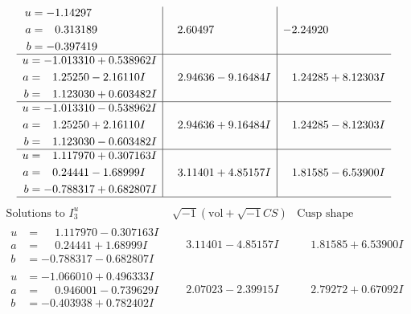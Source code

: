 \documentclass[1p]{elsarticle_modified}
\theoremstyle{definition}
\newcommand{\I}{\sqrt{-1}}
\begin{document}
$$\begin{array}{c|c|c}
\begin{aligned}
u &= -1.14297\phantom{ +0.000000I} \\
a &= \phantom{-}0.313189\phantom{ +0.000000I} \\
b &= -0.397419\phantom{ +0.000000I}\end{aligned}
 & \phantom{-}2.60497\phantom{ +0.000000I} & -2.24920\phantom{ +0.000000I} \\ \hline\begin{aligned}
u &= -1.013310 + 0.538962 I \\
a &= \phantom{-}1.25250 - 2.16110 I \\
b &= \phantom{-}1.123030 + 0.603482 I\end{aligned}
 & \phantom{-}2.94636 - 9.16484 I & \phantom{-}1.24285 + 8.12303 I \\ \hline\begin{aligned}
u &= -1.013310 - 0.538962 I \\
a &= \phantom{-}1.25250 + 2.16110 I \\
b &= \phantom{-}1.123030 - 0.603482 I\end{aligned}
 & \phantom{-}2.94636 + 9.16484 I & \phantom{-}1.24285 - 8.12303 I \\ \hline\begin{aligned}
u &= \phantom{-}1.117970 + 0.307163 I \\
a &= \phantom{-}0.24441 - 1.68999 I \\
b &= -0.788317 + 0.682807 I\end{aligned}
 & \phantom{-}3.11401 + 4.85157 I & \phantom{-}1.81585 - 6.53900 I\\
 \hline 
 \end{array}$$\newpage$$\begin{array}{c|c|c}  
\text{Solutions to }I^u_{3}& \I (\text{vol} + \sqrt{-1}CS) & \text{Cusp shape}\\
 \hline 
\begin{aligned}
u &= \phantom{-}1.117970 - 0.307163 I \\
a &= \phantom{-}0.24441 + 1.68999 I \\
b &= -0.788317 - 0.682807 I\end{aligned}
 & \phantom{-}3.11401 - 4.85157 I & \phantom{-}1.81585 + 6.53900 I \\ \hline\begin{aligned}
u &= -1.066010 + 0.496333 I \\
a &= \phantom{-}0.946001 - 0.739629 I \\
b &= -0.403938 + 0.782402 I\end{aligned}
 & \phantom{-}2.07023 - 2.39915 I & \phantom{-}2.79272 + 0.67092 I \\ \hline\begin{aligned}

\end{aligned}
\end{array}$$
\end{document}
